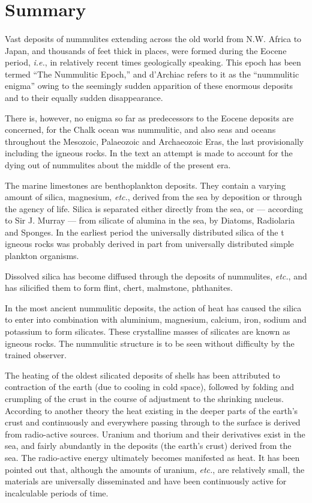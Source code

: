 \documentclass[a4paper, 12pt, oneside]{article}
\begin{document}
\section{Summary}
\paragraph{}
Vast deposits of nummulites extending across the old world from N.W. Africa to Japan, and thousands of feet thick in places, were formed during the Eocene period, \emph{i.e.}, in relatively recent times geologically speaking. This epoch has been termed ``The Nummulitic Epoch,'' and d'Archiac refers to it as the ``nummulitic enigma'' owing to the seemingly sudden apparition of these enormous deposits and to their equally sudden disappearance.

There is, however, no enigma so far as predecessors to the Eocene deposits are concerned, for the Chalk ocean was nummulitic, and also seas and oceans throughout the Mesozoic, Palaeozoic and Archaeozoic Eras, the last provisionally including the igneous rocks. In the text an attempt is made to account for the dying out of nummulites about the middle of the present era.

The marine limestones are benthoplankton deposits. They contain a varying amount of silica, magnesium, \emph{etc.}, derived from the sea by deposition or through the agency of life. Silica is separated either directly from the sea, or --- according to Sir J. Murray --- from silicate of alumina in the sea, by Diatoms, Radiolaria and Sponges. In the earliest period the universally distributed silica of the t igneous rocks was probably derived in part from universally distributed simple plankton organisms.

Dissolved silica has become diffused through the deposits of nummulites, \emph{etc.}, and has silicified them to form flint, chert, malmstone, phthanites.

In the most ancient nummulitic deposits, the action of heat has caused the silica to enter into combination with aluminium, magnesium, calcium, iron, sodium and potassium to form silicates. These crystalline masses of silicates are known as igneous rocks. The nummulitic structure is to be seen without difficulty by the trained observer.

The heating of the oldest silicated deposits of shells has been attributed to contraction of the earth (due to cooling in cold space), followed by folding and crumpling of the crust in the course of adjustment to the shrinking nucleus. According to another theory the heat existing in the deeper parts of the earth's crust and continuously and everywhere passing through to the surface is derived from radio-active sources. Uranium and thorium and their derivatives exist in the sea, and fairly abundantly in the deposits (the earth's crust) derived from the sea. The radio-active energy ultimately becomes manifested as heat. It has been pointed out that, although the amounts of uranium, \emph{etc.}, are relatively small, the materials are universally disseminated and have been continuously active for incalculable periods of time.
\end{document}
